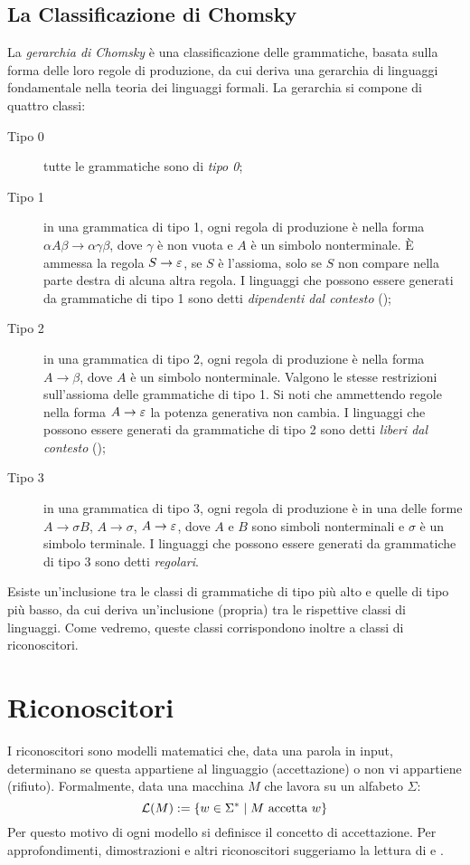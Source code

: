 \subsection{La Classificazione di Chomsky}\label{subs:prel:chom}
La \emph{gerarchia di Chomsky} \cite{Chomsky:56:hier} è una classificazione delle grammatiche, basata sulla forma delle loro regole di produzione, da cui deriva una gerarchia di linguaggi fondamentale nella teoria dei linguaggi formali. La gerarchia si compone di quattro classi:
\begin{description}
	\item[Tipo 0] tutte le grammatiche sono di \emph{tipo 0};
	\item[Tipo 1] in una grammatica di tipo 1, ogni regola di produzione è nella forma $\alpha A\beta\to\alpha\gamma\beta$, dove $\gamma$ è non vuota e $A$ è un simbolo nonterminale. È ammessa la regola $S\to\varepsilon$, se $S$ è l'assioma, solo se $S$ non compare nella parte destra di alcuna altra regola. I linguaggi che possono essere generati da grammatiche di tipo 1 sono detti \emph{dipendenti dal contesto} ();
	\item[Tipo 2] in una grammatica di tipo 2, ogni regola di produzione è nella forma $A\to\beta$, dove $A$ è un simbolo nonterminale. Valgono le stesse restrizioni sull'assioma delle grammatiche di tipo 1. Si noti che ammettendo regole nella forma $A\to\varepsilon$ la potenza generativa non cambia. I linguaggi che possono essere generati da grammatiche di tipo 2 sono detti \emph{liberi dal contesto} ();
	\item[Tipo 3] in una grammatica di tipo 3, ogni regola di produzione è in una delle forme $A\to\sigma B$, $A\to\sigma$, $A\to\varepsilon$, dove $A$ e $B$ sono simboli nonterminali e $\sigma$ è un simbolo terminale. I linguaggi che possono essere generati da grammatiche di tipo 3 sono detti \emph{regolari}.
\end{description}
Esiste un'inclusione tra le classi di grammatiche di tipo più alto e quelle di tipo più basso, da cui deriva un'inclusione (propria) tra le rispettive classi di linguaggi. Come vedremo, queste classi corrispondono inoltre a classi di riconoscitori.



\section{Riconoscitori}
I riconoscitori sono modelli matematici che, data una parola in input, determinano se questa appartiene al linguaggio (accettazione) o non vi appartiene (rifiuto). Formalmente, data una macchina $M$ che lavora su un alfabeto $\Sigma$:
\begin{equation*}
	\mathcal L(M) := \left\{ w\in\Sigma^*\mid M\text{ accetta }w \right\}
\end{equation*}
Per questo motivo di ogni modello si definisce il concetto di accettazione.
Per approfondimenti, dimostrazioni e altri riconoscitori suggeriamo la lettura di \cite{Hopcroft:79:introLFA} e \cite{Shallit:09:secondLFA}.


